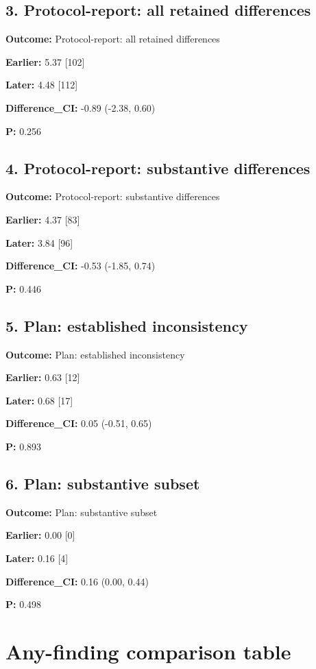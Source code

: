 \documentclass[10pt,a4paper]{article}
\begin{document}
\subsection*{3.\allowbreak{} Protocol-\allowbreak{}report: all retained differences}
\textbf{Outcome:} Protocol-\allowbreak{}report: all retained differences\par
\textbf{Earlier:} 5.\allowbreak{}37 [102]\par
\textbf{Later:} 4.\allowbreak{}48 [112]\par
\textbf{Difference\_\allowbreak{}CI:} -\allowbreak{}0.\allowbreak{}89 (-\allowbreak{}2.\allowbreak{}38, 0.\allowbreak{}60)\par
\textbf{P:} 0.\allowbreak{}256\par
\subsection*{4.\allowbreak{} Protocol-\allowbreak{}report: substantive differences}
\textbf{Outcome:} Protocol-\allowbreak{}report: substantive differences\par
\textbf{Earlier:} 4.\allowbreak{}37 [83]\par
\textbf{Later:} 3.\allowbreak{}84 [96]\par
\textbf{Difference\_\allowbreak{}CI:} -\allowbreak{}0.\allowbreak{}53 (-\allowbreak{}1.\allowbreak{}85, 0.\allowbreak{}74)\par
\textbf{P:} 0.\allowbreak{}446\par
\subsection*{5.\allowbreak{} Plan: established inconsistency}
\textbf{Outcome:} Plan: established inconsistency\par
\textbf{Earlier:} 0.\allowbreak{}63 [12]\par
\textbf{Later:} 0.\allowbreak{}68 [17]\par
\textbf{Difference\_\allowbreak{}CI:} 0.\allowbreak{}05 (-\allowbreak{}0.\allowbreak{}51, 0.\allowbreak{}65)\par
\textbf{P:} 0.\allowbreak{}893\par
\subsection*{6.\allowbreak{} Plan: substantive subset}
\textbf{Outcome:} Plan: substantive subset\par
\textbf{Earlier:} 0.\allowbreak{}00 [0]\par
\textbf{Later:} 0.\allowbreak{}16 [4]\par
\textbf{Difference\_\allowbreak{}CI:} 0.\allowbreak{}16 (0.\allowbreak{}00, 0.\allowbreak{}44)\par
\textbf{P:} 0.\allowbreak{}498\par
\clearpage\section{Any-\allowbreak{}finding comparison table}
\end{document}
